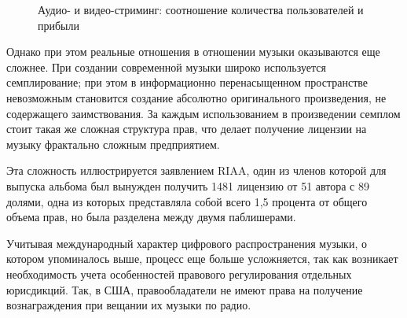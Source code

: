 \documentclass[12pt]{report}
\begin{document}
\begin{figure}[h]
\centering
\caption{Аудио- и видео-стриминг: соотношение количества пользователей и прибыли}
\vspace{20pt}
\userRevenue
{}
\end{figure}	

\begin{multicols}{2}
Однако при этом реальные отношения в отношении музыки оказываются еще сложнее. 
	При создании современной музыки широко используется семплирование; при этом в информационно перенасыщенном пространстве невозможным становится создание абсолютно оригинального произведения, не содержащего заимствования. За каждым использованием в произведении семплом стоит такая же сложная структура прав, что делает получение лицензии на музыку фрактально сложным предприятием.

Эта сложность иллюстрируется заявлением RIAA, один из членов которой для выпуска альбома был вынужден получить 1481 лицензию от 51 автора с 89 долями, одна из которых представляла собой всего 1,5 процента от общего объема прав, но была разделена между двумя паблишерами.

Учитывая международный характер цифрового распространения музыки, о котором упоминалось выше, процесс еще больше усложняется, так как возникает необходимость учета особенностей правового регулирования отдельных юрисдикций. Так, в США, правообладатели не имеют права на получение вознаграждения при вещании их музыки по радио.
\end{multicols}
\vfill\null\pagebreak
\end{document}
